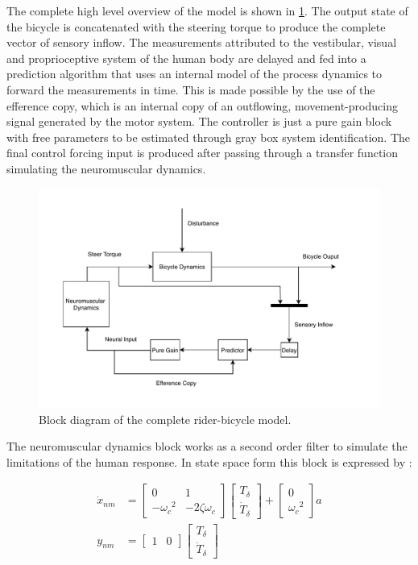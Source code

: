 The complete high level overview of the model is shown in \cref{fig:paper3}. The output state of the bicycle is concatenated with the steering torque to produce the complete vector of sensory inflow. The measurements attributed to the vestibular, visual and proprioceptive system of the human body are delayed and fed into a prediction algorithm that uses an internal model of the process dynamics to forward the measurements in time. This is made possible by the use of the efference copy, which is an internal copy of an outflowing, movement-producing signal generated by the motor system. The controller  is just a pure gain block with free parameters to be estimated through gray box system identification. The final control forcing input is produced after passing through a transfer function simulating the neuromuscular dynamics.
\begin{figure}[ht]
    \centering
    \captionsetup{justification=centering,margin=2cm}

    \includegraphics[scale=0.8]{images/high_level_block.pdf}
    \caption{Block diagram of the complete rider-bicycle model.} 
    \label{fig:paper3}
\end{figure}

The neuromuscular dynamics block works as a second order filter to simulate the limitations of the human response. In state space form this block is expressed by :

\begin{align}
\dot{x}_{nm} &= \begin{bmatrix}0 & 1 \\ -{\omega_c}^2 & -2\zeta{\omega_c}\end{bmatrix} \begin{bmatrix} T_\delta \\ \dot{T}_\delta\end{bmatrix} + \begin{bmatrix} 0 \\ {\omega_c}^2\end{bmatrix} a     \label{eq:gnmBLOCKA}    
    \\
y_{nm} &= \begin{bmatrix}1 & 0\end{bmatrix} \begin{bmatrix} T_\delta \\ \dot{T}_\delta\end{bmatrix}
    \label{eq:gnmBLOCKB}
\end{align}

